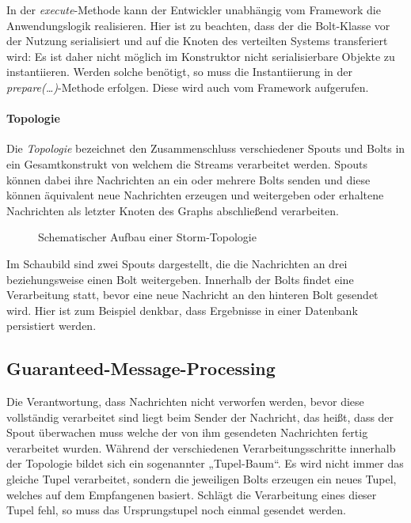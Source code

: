 \documentclass[a4paper,11pt]{scrartcl}
\begin{document}
  In der \textit{execute}-Methode kann der Entwickler unabhängig vom
  Framework die Anwendungslogik realisieren. Hier ist zu beachten,
  dass der die Bolt-Klasse vor der Nutzung serialisiert und auf die
  Knoten des verteilten Systems transferiert wird: Es ist daher nicht
  möglich im Konstruktor nicht serialisierbare Objekte zu instantiieren.
  Werden solche benötigt, so muss die Instantiierung in der
  \textit{prepare(\ldots)}-Methode erfolgen. Diese wird auch vom
  Framework aufgerufen.

  \paragraph{Topologie}
  Die \textit{Topologie} bezeichnet den Zusammenschluss verschiedener
  Spouts und Bolts in ein Gesamtkonstrukt von welchem die Streams
  verarbeitet werden. Spouts können dabei ihre Nachrichten an ein oder
  mehrere Bolts senden und diese können äquivalent neue Nachrichten
  erzeugen und weitergeben oder erhaltene Nachrichten als letzter
  Knoten des Graphs abschließend verarbeiten.

  \begin{figure}[!h]
    \center
    \scalebox{.7}{}
    \caption{Schematischer Aufbau einer Storm-Topologie}
    \label{fig:topology}
  \end{figure}

  Im Schaubild sind zwei Spouts dargestellt, die die Nachrichten an
  drei beziehungsweise einen Bolt weitergeben. Innerhalb der Bolts
  findet eine Verarbeitung statt, bevor eine neue Nachricht an den
  hinteren Bolt gesendet wird. Hier ist zum Beispiel denkbar, dass
  Ergebnisse in einer Datenbank persistiert werden.

  \subsection{Guaranteed-Message-Processing}
  Die Verantwortung, dass Nachrichten nicht verworfen werden, bevor
  diese vollständig verarbeitet sind liegt beim Sender der Nachricht,
  das heißt, dass der Spout überwachen muss welche der von ihm
  gesendeten Nachrichten fertig verarbeitet wurden. Während der
  verschiedenen Verarbeitungsschritte innerhalb der Topologie bildet
  sich ein sogenannter „Tupel-Baum“. Es wird nicht immer das gleiche
  Tupel verarbeitet, sondern die jeweiligen Bolts erzeugen ein neues
  Tupel, welches auf dem Empfangenen basiert. Schlägt die Verarbeitung
  eines dieser Tupel fehl, so muss das Ursprungstupel noch einmal
  gesendet werden.\cite{stormguaranteedprocessing}
\end{document}
